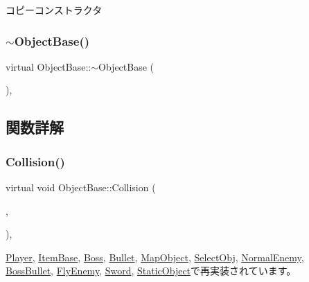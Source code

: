 コピーコンストラクタ 

\mbox{\label{class_object_base_a7074bc9389069351c2d0eee6a47e5ee3}} 
\subsubsection{\texorpdfstring{$\sim$\+Object\+Base()}{~ObjectBase()}}
{\footnotesize\ttfamily virtual Object\+Base\+::$\sim$\+Object\+Base (\begin{DoxyParamCaption}{ }\end{DoxyParamCaption})\hspace{0.3cm}{\ttfamily [inline]}, {\ttfamily [virtual]}}



\subsection{関数詳解}
\mbox{\label{class_object_base_a3e1db79dfa119be067d816c22d09839d}} 
\subsubsection{\texorpdfstring{Collision()}{Collision()}}
{\footnotesize\ttfamily virtual void Object\+Base\+::\+Collision (\begin{DoxyParamCaption}\item[{\mbox{\hyperlink{class_object_base}{Object\+Base}} $\ast$}]{,  }\item[{\mbox{\hyperlink{common_8h_ae148fff5818e9444b4ab2288829559bf}{Vec2}}}]{ }\end{DoxyParamCaption})\hspace{0.3cm}{\ttfamily [inline]}, {\ttfamily [virtual]}}



\mbox{\hyperlink{class_player_a992b5c7e0d981308ed56706c6e71a709}{Player}}, \mbox{\hyperlink{class_item_base_ae5c2bcf78c74126a6f76783ca927c7ab}{Item\+Base}}, \mbox{\hyperlink{class_boss_a36b664185c0aa3ae4c6fc58c33d8485b}{Boss}}, \mbox{\hyperlink{class_bullet_a7a6bbc20017be35140ed1099ea457429}{Bullet}}, \mbox{\hyperlink{class_map_object_a76b9161f2723272ad361d0b190e46245}{Map\+Object}}, \mbox{\hyperlink{class_select_obj_a497ff683aefe9bf77201eee1e3948e15}{Select\+Obj}}, \mbox{\hyperlink{class_normal_enemy_a71cb11fe60d713ce638dcec5d66912e6}{Normal\+Enemy}}, \mbox{\hyperlink{class_boss_bullet_ab742fa1d233e0df5d49cc239e24eeec3}{Boss\+Bullet}}, \mbox{\hyperlink{class_fly_enemy_a90b7b82f93094aaee9069daafe319a2b}{Fly\+Enemy}}, \mbox{\hyperlink{class_sword_a1dcab625754ca097ad814ee544c6a872}{Sword}}, \mbox{\hyperlink{class_static_object_a64c8803ff881d578d103413e299dbf7f}{Static\+Object}}で再実装されています。

